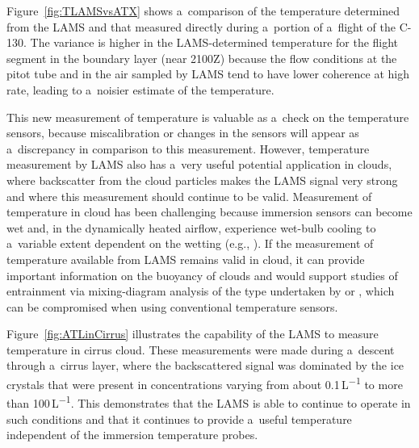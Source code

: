 \documentclass[amtd, online, hvmath]{copernicus}
\begin{document}
Figure~\ref{fig:TLAMSvsATX} shows a~comparison of the temperature
determined from the LAMS and that measured directly during a~portion
of a~flight of the C-130. The variance is higher in the
LAMS-determined temperature for the flight segment in the boundary
layer (near 2100Z) because the flow conditions at the pitot tube and
in the air sampled by LAMS tend to have lower coherence at high rate,
leading to a~noisier estimate of the temperature.

This new measurement of temperature is valuable as a~check on the
temperature sensors, because miscalibration or changes in the sensors
will appear as a~\mbox{discrepancy} in comparison to this
measurement. However, temperature measurement by LAMS also has a~very
useful potential application in clouds, where backscatter from the
cloud particles makes the LAMS signal very strong and where this
measurement should continue to be valid. Measurement of temperature in
cloud has been challenging because immersion sensors can become wet
and, in the dynamically heated airflow, experience wet-bulb cooling to
a~variable extent dependent on the wetting (e.g.,
\citealp{heymsJAM79,WangGeertz2009}).  If the measurement of
temperature available from LAMS remains valid in cloud, it can provide
important information on the buoyancy of clouds and would support
studies of entrainment via mixing-diagram analysis of the type
undertaken by \citet{paluch1979} or \citet{betts:1983}, which can be
compromised when using conventional temperature sensors.

Figure~\ref{fig:ATLinCirrus} illustrates the capability of the LAMS to
measure temperature in cirrus cloud. These measurements were made
during a~descent through a~cirrus layer, where the backscattered
signal was dominated by the ice crystals that were present in
concentrations varying from about 0.1\,\unit{L^{-1}} to more than
100\,\unit{L^{-1}}.  This demonstrates that the LAMS is able to
continue to operate in such conditions and that it continues to
provide a~useful temperature independent of the immersion temperature
probes.
\end{document}
